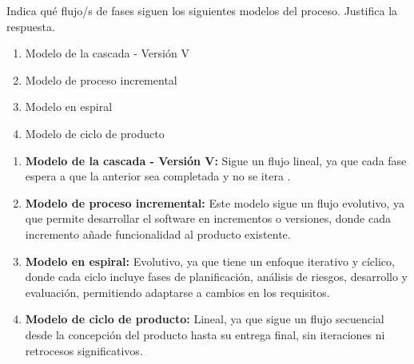

\begin{enunciado}
    Indica qué flujo/s de fases siguen los siguientes modelos del proceso.
    Justifica la respuesta.
    \begin{enumerate}
        \item Modelo de la cascada - Versión V
        \item Modelo de proceso incremental
        \item Modelo en espiral
        \item Modelo de ciclo de producto
    \end{enumerate}
\end{enunciado}

\begin{solucion}
    \begin{enumerate}
        \item \textbf{Modelo de la cascada - Versión V:} Sigue un flujo lineal, ya que cada fase espera a que la anterior sea completada y no se itera .
        \item \textbf{Modelo de proceso incremental:} Este modelo sigue un flujo evolutivo, ya que permite desarrollar el software en incrementos o versiones, donde cada incremento añade funcionalidad al producto existente.
        \item \textbf{Modelo en espiral:} Evolutivo, ya que tiene un enfoque iterativo y cíclico, donde cada ciclo incluye fases de planificación, análisis de riesgos, desarrollo y evaluación, permitiendo adaptarse a cambios en los requisitos.
        \item \textbf{Modelo de ciclo de producto:} Lineal, ya que sigue un flujo secuencial desde la concepción del producto hasta su entrega final, sin iteraciones ni retrocesos significativos.
    \end{enumerate}
\end{solucion}
